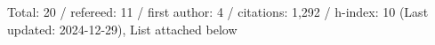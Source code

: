 Total: 20 / refereed: 11 / first author: 4 / citations: 1,292 / h-index: 10 (Last updated: 2024-12-29), List attached below